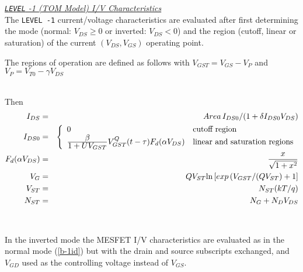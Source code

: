 \medskip

\noindent\underline{\sl {\tt LEVEL} -1 (TOM Model)
I/V Characteristics}\\[0.1in]
The {\tt LEVEL -1} current/voltage characteristics are evaluated after first
determining the mode (normal: $V_{DS} \ge 0$ or inverted:
$V_{DS} < 0$) and the region (cutoff,
linear or saturation) of the current
$(V_{DS}, V_{GS})$ operating point.

\noindent


\medskip

\noindent
The regions of operation are defined as follows
with \hfill $V_{GST} = V_{GS}-V_P$ \inlineeq
and\hfill$V_P = V_{T0} - \gamma V_{DS}$\inlineeq

\medskip

\hspace*{\fill}\\[0.1in]
Then
\begin{eqnarray}
I_{DS} &=&  Area\, {{\textstyle I_{DS0}}/ {\left( \textstyle 1 + \delta I_{DS0} V_{DS}
           \right) }} \label{b-1id} \\
I_{DS0} &=& \left\{ \begin{array}{ll}
      0  & \mbox{cutoff region} \\
      {{\textstyle\beta}\over{\textstyle 1 + U V_{GST}}}
      V^Q_{GST}(t-\tau) F_d(\alpha V_{DS})
         &\mbox{linear and saturation regions} \end{array} \right. \\ %
F_d(\alpha V_{DS})&=&{{ \textstyle x } \over { \sqrt{1 + x^2}}} \\
   V_G&=&Q V_{ST} \mbox{ln}
     \left[ exp \left( V_{GST}/(Q V_{ST} \right) + 1 \right]\\
   V_{ST}&=&N_{ST} (kT/q) \\
   N_{ST}&=&N_G + N_D V_{DS}
\end{eqnarray}
\\[0.1in]
\\[0.2in]
In the inverted mode the MESFET I/V characteristics are evaluated as in the
normal mode (\ref{b-1id}) but with the drain and source subscripts
exchanged, and $V_{GD}$ used as the controlling voltage instead of $V_{GS}$.

